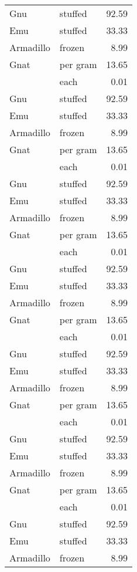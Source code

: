 {\begin{center}
\begin{xtabular}{llr}
Gnu       & stuffed  & 92.59 \\
Emu       & stuffed  & 33.33 \\
Armadillo & frozen   & 8.99  \\
Gnat      & per gram & 13.65 \\
          & each     & 0.01  \\
Gnu       & stuffed  & 92.59 \\
Emu       & stuffed  & 33.33 \\
Armadillo & frozen   & 8.99  \\
Gnat      & per gram & 13.65 \\
          & each     & 0.01  \\
Gnu       & stuffed  & 92.59 \\
Emu       & stuffed  & 33.33 \\
Armadillo & frozen   & 8.99  \\
Gnat      & per gram & 13.65 \\
          & each     & 0.01  \\
Gnu       & stuffed  & 92.59 \\
Emu       & stuffed  & 33.33 \\
Armadillo & frozen   & 8.99  \\
Gnat      & per gram & 13.65 \\
          & each     & 0.01  \\
Gnu       & stuffed  & 92.59 \\
Emu       & stuffed  & 33.33 \\
Armadillo & frozen   & 8.99  \\
Gnat      & per gram & 13.65 \\
          & each     & 0.01  \\
Gnu       & stuffed  & 92.59 \\
Emu       & stuffed  & 33.33 \\
Armadillo & frozen   & 8.99  \\
Gnat      & per gram & 13.65 \\
          & each     & 0.01  \\
Gnu       & stuffed  & 92.59 \\
Emu       & stuffed  & 33.33 \\
Armadillo & frozen   & 8.99  \\
\end{xtabular}
\end{center}
} 

